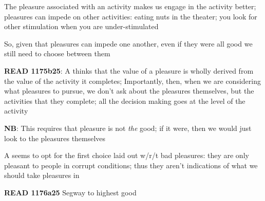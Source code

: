 \documentclass[11pt]{article}
\begin{document}
\noindent The pleasure associated with an activity makes us engage in the activity better; pleasures can impede on other activities: eating nuts in the theater; you look for other stimulation when you are under-stimulated
\vspace*{2mm}

\noindent So, given that pleasures can impede one another, even if they were all good we still need to choose between them
\vspace*{2mm}

\noindent\textbf{READ 1175b25}: A thinks that the value of a pleasure is wholly derived from the value of the activity it completes; Importantly, then, when we are considering what pleasures to pursue, we don't ask about the pleasures themselves, but the activities that they complete; all the decision making goes at the level of the activity
\vspace*{2mm}

\noindent\textbf{NB}: This requires that pleasure is not \emph{the} good; if it were, then we would just look to the pleasures themselves
\vspace*{2mm}

\noindent A seems to opt for the first choice laid out w/r/t bad pleasures: they are only pleasant to people in corrupt conditions; thus they aren't indications of what we should take pleasures in
\vspace*{2mm}

\noindent\textbf{READ 1176a25} Segway to highest good
\end{document}
